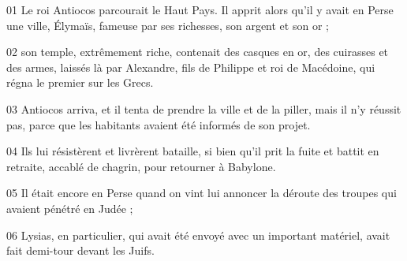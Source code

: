 01 Le roi Antiocos parcourait le Haut Pays. Il apprit alors qu’il y avait en Perse une ville, Élymaïs, fameuse par ses richesses, son argent et son or ;

02 son temple, extrêmement riche, contenait des casques en or, des cuirasses et des armes, laissés là par Alexandre, fils de Philippe et roi de Macédoine, qui régna le premier sur les Grecs.

03 Antiocos arriva, et il tenta de prendre la ville et de la piller, mais il n’y réussit pas, parce que les habitants avaient été informés de son projet.

04 Ils lui résistèrent et livrèrent bataille, si bien qu’il prit la fuite et battit en retraite, accablé de chagrin, pour retourner à Babylone.

05 Il était encore en Perse quand on vint lui annoncer la déroute des troupes qui avaient pénétré en Judée ;

06 Lysias, en particulier, qui avait été envoyé avec un important matériel, avait fait demi-tour devant les Juifs.